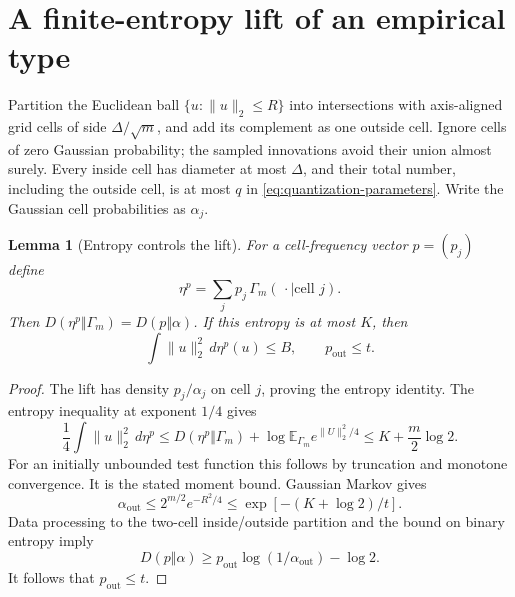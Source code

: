 \documentclass[11pt]{article}
\newtheorem{lemma}[theorem]{Lemma}\newtheorem{corollary}[theorem]{Corollary}
\theoremstyle{remark}\newtheorem{remark}[theorem]{Remark}
\newcommand{\E}{\mathbb E}\newcommand{\Prb}{\mathbb P}\newcommand{\R}{\mathbb R}
\begin{document}
\section{A finite-entropy lift of an empirical type}
Partition the Euclidean ball $\{u:\|u\|_2\leq R\}$ into intersections with
axis-aligned grid cells of side $\Delta/\sqrt m$, and add its complement as
one outside cell. Ignore cells of zero Gaussian probability; the sampled innovations avoid their union almost surely. Every inside
cell has diameter at most $\Delta$, and their total number, including the
outside cell, is at most $q$ in \eqref{eq:quantization-parameters}.
Write the Gaussian cell probabilities as $\alpha_j$.

\begin{lemma}[Entropy controls the lift]\label{lem:lift}
For a cell-frequency vector $p=(p_j)$ define
\[
 \eta^p=\sum_jp_j\,\Gamma_m(\,\cdot\mid\text{cell }j).
\]
Then $D(\eta^p\Vert\Gamma_m)=D(p\Vert\alpha)$.
If this entropy is at most $K$, then
\[
 \int\|u\|_2^2\,d\eta^p(u)\leq B,
 \qquad p_{\mathrm{out}}\leq t.
\]
\end{lemma}
\begin{proof}
The lift has density $p_j/\alpha_j$ on cell $j$, proving the entropy identity.
The entropy inequality at exponent $1/4$ gives
\[
 \frac14\int\|u\|_2^2\,d\eta^p
 \leq D(\eta^p\Vert\Gamma_m)
      +\log\E_{\Gamma_m}e^{\|U\|_2^2/4}
 \leq K+\frac m2\log2.
\]
For an initially unbounded test function this follows by truncation and
monotone convergence. It is the stated moment bound.
Gaussian Markov gives
\[
 \alpha_{\mathrm{out}}\leq2^{m/2}e^{-R^2/4}
 \leq\exp[-(K+\log2)/t].
\]
Data processing to the two-cell inside/outside partition and the bound on
binary entropy imply
\[
 D(p\Vert\alpha)\geq
 p_{\mathrm{out}}\log(1/\alpha_{\mathrm{out}})-\log2.
\]
It follows that $p_{\mathrm{out}}\leq t$.
\end{proof}
\end{document}
